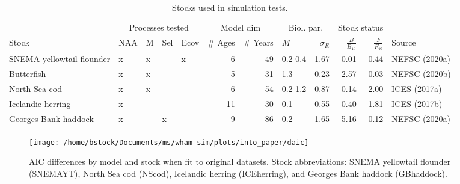 \documentclass[]{article}
\begin{document}
\begin{landscape}
\begin{table}

\caption{\label{tab:stock-list}Stocks used in simulation tests.}
\centering
\begin{tabular}[t]{lllllrrlrrrl}
\toprule
\multicolumn{1}{c}{ } & \multicolumn{4}{c}{Processes tested} & \multicolumn{2}{c}{Model dim} & \multicolumn{2}{c}{Biol. par.} & \multicolumn{2}{c}{Stock status} \\
\cmidrule(l{3pt}r{3pt}){2-5} \cmidrule(l{3pt}r{3pt}){6-7} \cmidrule(l{3pt}r{3pt}){8-9} \cmidrule(l{3pt}r{3pt}){10-11}
Stock & NAA & M & Sel & Ecov & \# Ages & \# Years & $M$ & $\sigma_R$ & $\frac{B}{B_{40}}$ & $\frac{F}{F_{40}}$ & Source\\
\midrule
SNEMA yellowtail flounder & x & x &  & x & 6 & 49 & 0.2-0.4 & 1.67 & 0.01 & 0.44 & NEFSC (2020a)\\
Butterfish & x & x &  &  & 5 & 31 & 1.3 & 0.23 & 2.57 & 0.03 & NEFSC (2020b)\\
North Sea cod & x & x &  &  & 6 & 54 & 0.2-1.2 & 0.87 & 0.14 & 2.00 & ICES (2017a)\\
Icelandic herring & x &  &  &  & 11 & 30 & 0.1 & 0.55 & 0.40 & 1.81 & ICES (2017b)\\
Georges Bank haddock & x &  & x &  & 9 & 86 & 0.2 & 1.65 & 5.16 & 0.12 & NEFSC (2020a)\\
\bottomrule
\end{tabular}
\end{table}
\end{landscape}

\pagebreak

\begin{landscape}
\begin{figure}

{\centering \texttt{[image: /home/bstock/Documents/ms/wham-sim/plots/into\_paper/daic]} 

}

\caption{AIC differences by model and stock when fit to original datasets. Stock abbreviations: SNEMA yellowtail flounder (SNEMAYT), North Sea cod (NScod), Icelandic herring (ICEherring), and Georges Bank haddock (GBhaddock).}\label{fig:daic}
\end{figure}
\end{landscape}

\pagebreak
\end{document}
